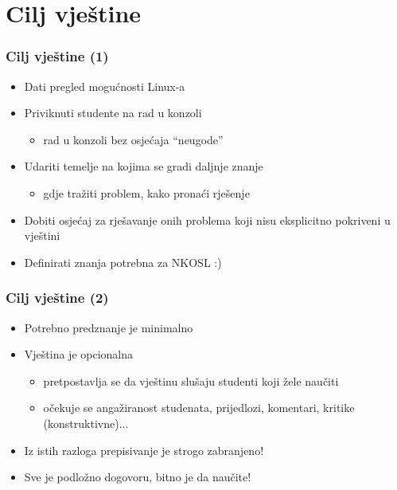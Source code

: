 \documentclass{beamer}
\begin{document}
\section{Cilj vještine}
\begin{frame}[t]
\frametitle{Cilj vještine (1)}
\begin{itemize}
	\item Dati pregled mogućnosti Linux-a
	\item Priviknuti studente na rad u konzoli
	\begin{itemize}
		\item rad u konzoli bez osjećaja “neugode”
	\end{itemize}
	\item Udariti temelje na kojima se gradi daljnje znanje
	\begin{itemize}
		\item gdje tražiti problem, kako pronaći rješenje
	\end{itemize}
	\item Dobiti osjećaj za rješavanje onih problema koji nisu eksplicitno pokriveni u vještini
	\item Definirati znanja potrebna za NKOSL :)
\end{itemize}
\end{frame}

\begin{frame}[t]
\frametitle{Cilj vještine (2)}
\begin{itemize}
	\item Potrebno predznanje je minimalno
	\item Vještina je opcionalna
	\begin{itemize}
		\item pretpostavlja se da vještinu slušaju studenti koji žele naučiti
		\item očekuje se angažiranost studenata, prijedlozi, komentari, kritike (konstruktivne)...
	\end{itemize}
	\item Iz istih razloga prepisivanje je strogo zabranjeno!
	\item Sve je podložno dogovoru, bitno je da naučite!
\end{itemize}
\end{frame}
\end{document}
